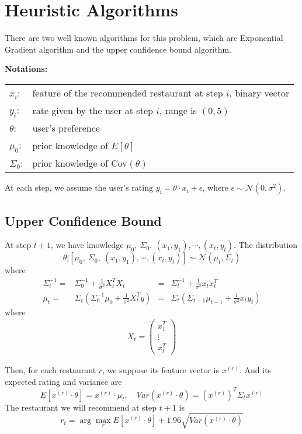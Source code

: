 \documentclass{article}
\theoremstyle{plain}
\theoremstyle{definition}
\begin{document}
\section{Heuristic Algorithms}
There are two well known algorithms for this problem, which are Exponential Gradient algorithm and the upper confidence bound algorithm.\

\textbf{Notations: }

\begin{center}
\begin{tabular}{ll}
${x}_i$: & feature of the recommended restaurant at step $i$, binary vector\\
$y_i$: & rate given by the user at step $i$, range is $(0,5)$\\
${\theta}$: & user's preference\\
${\mu_0}$: & prior knowledge of ${E}[{\theta}]$ \\
$\Sigma_0$: & prior knowledge of Cov$(\theta)$
\end{tabular}
\end{center}

At each step, we assume the user's rating $y_i = \theta\cdot {x}_i+\epsilon$, where $\epsilon\sim\mathcal{N}(0,\sigma^2)$.

\subsection{Upper Confidence Bound}
At step $t+1$, we have knowledge $\mu_0,\ \Sigma_0,\ ({x}_1, y_1), \cdots, ({x}_{t}, y_t)$. The distribution 
\[\theta | [ \mu_0,\ \Sigma_0,\ ({x}_1, y_1), \cdots, ({x}_{t}, y_t) ] \sim \mathcal{N}(\mu_{t}, \Sigma_{t}) \]
where 
\begin{align}
\Sigma_{t}^{-1} = & \Sigma_0^{-1}+\frac{1}{\sigma^2}X_t^TX_t &=& \Sigma_t^{-1} + \frac{1}{\sigma^2}{x}_t{x}_t^T\\
\mu_t = & \Sigma_t\left( \Sigma_0^{-1}\mu_0 + \frac{1}{\sigma^2}X_t^Ty \right) &= &\Sigma_t\left(\Sigma_{t-1}\mu_{t-1}+\frac{1}{\sigma^2}{x}_t y_t\right)
\end{align}
where 
\begin{align*}
X_t = \left(
\begin{array}{c}
{x}_1^T\\
\vdots\\
{x}_t^T
\end{array}\right)
\end{align*}

Then, for each restaurant $r$, we suppose its feature vector is ${x}^{(r)}$. And its expected rating and variance are
\[E[{x}^{(r)}\cdot \theta] = {x}^{(r)}\cdot \mu_t,\quad Var({x}^{(r)}\cdot \theta) =({x}^{(r)})^T\Sigma_t {x}^{(r)} \]
The restaurant we will recommend at step $t+1$ is
\[r_t = \arg\max_r E[{x}^{(r)}\cdot \theta] + 1.96 \sqrt{Var({x}^{(r)}\cdot \theta)}\]
\end{document}
